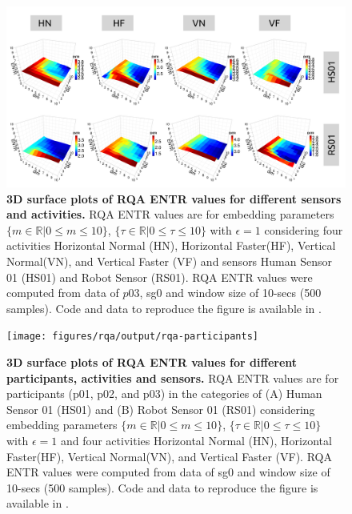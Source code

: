 \documentclass[fleqn,10pt]{wlscirep}
\begin{document}
\begin{figure}[ht]
\centering
\includegraphics[width=1.0\textwidth]{figures/rqa/output/rqa-sensors-activities}
    \caption{
	{\bf 3D surface plots of RQA ENTR values for different sensors and activities.}
	RQA ENTR values are for embedding parameters
	$ \{ m \in \mathbb{R} | 0 \le m \le 10  \}$,
	$ \{ \tau \in \mathbb{R} | 0 \le \tau \le 10  \}$
	with $\epsilon = 1 $ considering four activities 
	Horizontal Normal (HN), Horizontal Faster(HF), Vertical Normal(VN), and 
	Vertical Faster (VF) and sensors Human Sensor 01 (HS01) and 
	Robot Sensor (RS01).
	RQA ENTR values were computed from data of $p03$, sg0 and 
	window size of 10-secs (500 samples).
	Code and data to reproduce the figure is available in \cite{srep2020}.
       }
\label{fig:3dRQAENTR_sensoractivities}
\end{figure}

\begin{figure}[ht]
\centering
\texttt{[image: figures/rqa/output/rqa-participants]}
    \caption{
	{\bf 3D surface plots of RQA ENTR values for different participants, activities and sensors.}
	RQA ENTR values are for participants (p01, p02, and p03) 
	in the categories of 
	(A) Human Sensor 01 (HS01) and 
	(B) Robot Sensor 01 (RS01)
	considering embedding parameters
	$ \{ m \in \mathbb{R} | 0 \le m \le 10  \}$,
	$ \{ \tau \in \mathbb{R} | 0 \le \tau \le 10  \}$
	with $\epsilon = 1$ and four activities 
	Horizontal Normal (HN), Horizontal Faster(HF), Vertical Normal(VN), and 
	Vertical Faster (VF).
	RQA ENTR values were computed from data of sg0 and window size of 10-secs (500 samples).
	Code and data to reproduce the figure is available in \cite{srep2020}.
       }
\label{fig:3dRQAENTR_participantsactivities}
\end{figure}
\end{document}

